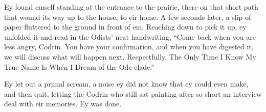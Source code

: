 Ey found emself standing at the entrance to the prairie, there on that short path that wound its way up to the house, to eir home. A few seconds later, a slip of paper fluttered to the ground in front of em. Reaching down to pick it up, ey unfolded it and read in the Odists' neat handwriting, ``Come back when you are less angry, Codrin. You have your confirmation, and when you have digested it, we will discuss what will happen next. Respectfully, The Only Time I Know My True Name Is When I Dream of the Ode clade.''

Ey let out a primal scream, a noise ey did not know that ey could even make, and then quit, letting the Codrin who still sat painting after so short an interview deal with eir memories. Ey was done.
